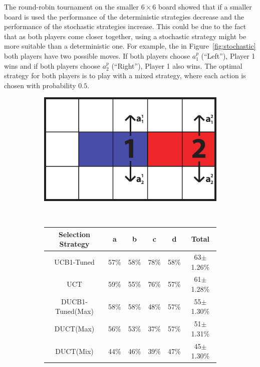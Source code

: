 \documentclass{article}
\begin{document}
The round-robin tournament on the smaller $6 \times 6$ board showed that if a smaller board is used the performance of the deterministic strategies decrease and the performance of the stochastic strategies increase. 
This could be due to the fact that as both players come closer together, using a stochastic strategy might be more suitable than a deterministic one.
For example, the in Figure~\ref{fig:stochastic} both players have two possible moves. If both players choose $a^{p}_{1}$ (``Left''), Player 1 wins and if both players choose $a^{p}_{2}$ (``Right''), Player 1 also wins. The optimal strategy for both players is to play with a mixed strategy, where each action is chosen with probability $0.5$. 

\begin{figure}[t]
\centering
\begin{subfigure}[c]{0.3\textwidth}
\includegraphics[width=\textwidth]{images/stochastic.pdf}
\end{subfigure}
~~~
\begin{subfigure}[c]{0.5\textwidth}
\scriptsize
\centering
\begin{tabular}{|c||c|c|c|c|c|}
									\hline
	Selection Strategy	& a 		  & b 		  & c 		  & d 		  & Total 	\\ \hline
	UCB1-Tuned		      & 57\%	  & 58\%		& 78\%		& 58\%		& 63$\pm$1.26\%		\\ \hline
	UCT			            & 59\%		& 55\%		& 76\%		& 57\%		& 61$\pm$1.28\%		\\ \hline
	DUCB1-Tuned(Max)	  & 58\%		& 58\%		& 48\%		& 57\%		& 55$\pm$1.30\%		\\ \hline
	DUCT(Max)		        & 56\%		& 53\%		& 37\%		& 57\%		& 51$\pm$1.31\%		\\ \hline
	DUCT(Mix)		        & 44\%		& 46\%		& 39\%		& 47\%		& 45$\pm$1.30\%		\\ \hline

\end{tabular}
\end{subfigure}
\end{figure}
\end{document}
